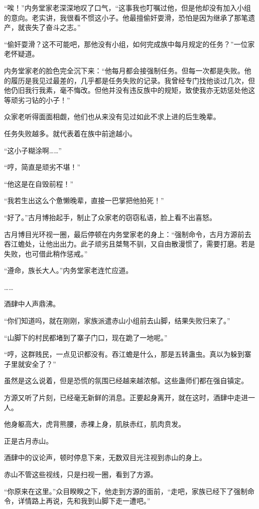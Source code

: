 \begin{this_body}
“唉！”内务堂家老深深地叹了口气，“这事我也叮嘱过他，但是他却没有加入小组的意向。老实讲，我很看不惯这小子。他最擅偷奸耍滑，恐怕是因为继承了那笔遗产，就丧失了奋斗之志。”

“偷奸耍滑？这不可能吧，那他没有小组，如何完成族中每月规定的任务？”一位家老怀疑道。

内务堂家老的脸色完全沉下来：“他每月都会接强制任务。但每一次都是失败。他的履历是我见过最差的，几乎都是任务失败的记录。我曾经专门找他谈过几次，但他仍旧我行我素，毫不悔改。但他并没有违反族中的规矩，致使我亦无妨惩处他这等顽劣刁钻的小子！”

众家老听得面面相觑，他们也从来没有见过如此不求上进的后生晚辈。

任务失败越多。就代表着在族中前途越小。

“这小子糊涂啊……”

“哼，简直是顽劣不堪！”

“他这是在自毁前程！”

“我若生出这么个惫懒晚辈，直接一巴掌把他拍死！”

“好了。”古月博抬起手，制止了众家老的窃窃私语，脸上看不出喜怒。

古月博目光环视一圈，最后停顿在内务堂家老的身上：“强制命令，古月方源前去吞江蟾处，让他出出力。此子顽劣且桀骜不驯，又自由散漫惯了，需要打磨。若是失败，也可借此稍作惩戒。”

“遵命，族长大人。”内务堂家老连忙应道。

……

酒肆中人声鼎沸。

“你们知道吗，就在刚刚，家族派遣赤山小组前去山脚，结果失败归来了。”

“山脚下的村民都堵到了寨子门口，现在跪了一地呢。”

“哼，这群贱民，一点见识都没有。吞江蟾是什么，那是五转蛊虫。真以为躲到寨子里就安全了？”

虽然是这么说着，但是恐慌的氛围已经越来越浓郁。这些蛊师们都在强自镇定。

方源又听了片刻，已经毫无新鲜的消息。正要起身离开，就在这时，酒肆中走进一人。

他身躯高大，虎背熊腰，赤裸上身，肌肤赤红，肌肉贲发。

正是古月赤山。

酒肆中的议论声，顿时停息下来，无数双目光注视到赤山的身上。

赤山不管这些视线，只是扫视一圈，看到了方源。

“你原来在这里。”众目睽睽之下，他走到方源的面前，“走吧，家族已经下了强制命令，详情路上再说，先和我到山脚下走一遭吧。”


\end{this_body}
